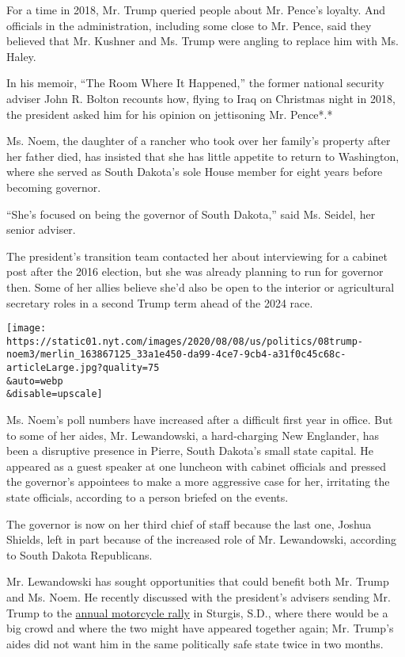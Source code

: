 For a time in 2018, Mr. Trump queried people about Mr. Pence's loyalty.
And officials in the administration, including some close to Mr. Pence,
said they believed that Mr. Kushner and Ms. Trump were angling to
replace him with Ms. Haley.

In his memoir, ``The Room Where It Happened,'' the former national
security adviser John R. Bolton recounts how, flying to Iraq on
Christmas night in 2018, the president asked him for his opinion on
jettisoning Mr. Pence*.*

Ms. Noem, the daughter of a rancher who took over her family's property
after her father died, has insisted that she has little appetite to
return to Washington, where she served as South Dakota's sole House
member for eight years before becoming governor.

``She's focused on being the governor of South Dakota,'' said Ms.
Seidel, her senior adviser.

The president's transition team contacted her about interviewing for a
cabinet post after the 2016 election, but she was already planning to
run for governor then. Some of her allies believe she'd also be open to
the interior or agricultural secretary roles in a second Trump term
ahead of the 2024 race.

\texttt{[image: https://static01.nyt.com/images/2020/08/08/us/politics/08trump-noem3/merlin\_163867125\_33a1e450-da99-4ce7-9cb4-a31f0c45c68c-articleLarge.jpg?quality=75\\\&auto=webp\\\&disable=upscale]}

Ms. Noem's poll numbers have increased after a difficult first year in
office. But to some of her aides, Mr. Lewandowski, a hard-charging New
Englander, has been a disruptive presence in Pierre, South Dakota's
small state capital. He appeared as a guest speaker at one luncheon with
cabinet officials and pressed the governor's appointees to make a more
aggressive case for her, irritating the state officials, according to a
person briefed on the events.

The governor is now on her third chief of staff because the last one,
Joshua Shields, left in part because of the increased role of Mr.
Lewandowski, according to South Dakota Republicans.

Mr. Lewandowski has sought opportunities that could benefit both Mr.
Trump and Ms. Noem. He recently discussed with the president's advisers
sending Mr. Trump to the
\href{https://www.nytimes.com/2020/08/07/us/sturgis-motorcyle-rally.html}{annual
motorcycle rally} in Sturgis, S.D., where there would be a big crowd and
where the two might have appeared together again; Mr. Trump's aides did
not want him in the same politically safe state twice in two months.

